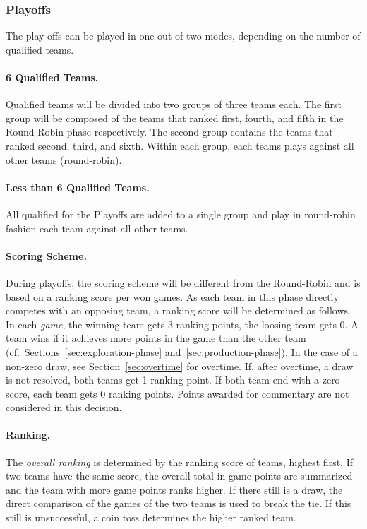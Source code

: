 \documentclass[12pt,twoside]{article}
\newcommand{\refsec}[1]{Section~\ref{#1}}
\begin{document}
\subsubsection{Playoffs}
The play-offs can be played in one out of two modes, depending on the number of
qualified teams.

\paragraph{6 Qualified Teams.~}
Qualified teams will be divided into two groups of three teams each. The first
group will be composed of the teams that ranked first, fourth, and fifth in the
Round-Robin phase respectively. The second group contains the teams that ranked
second, third, and sixth. Within each group, each teams plays against all other
teams (round-robin).

\paragraph{Less than 6 Qualified Teams.~}
All qualified for the Playoffs are added to a single group and play in
round-robin fashion each team against all other teams.

\paragraph{Scoring Scheme.~}
During playoffs, the scoring scheme will be different from the Round-Robin and
is based on a ranking score per won games. As each team in this phase directly
competes with an opposing team, a ranking score will be determined as
follows. In each \emph{game}, the winning team gets 3 ranking points, the
loosing team gets 0. A team wins if it achieves more points in the game than the
other team (cf.~Sections~\ref{sec:exploration-phase}
and~\ref{sec:production-phase}).  In the case of a non-zero draw, see
\refsec{sec:overtime} for overtime.  If, after overtime, a draw is not resolved,
both teams get 1 ranking point. If both team end with a zero score, each team
gets 0 ranking points. Points awarded for commentary are not considered in this
decision.

\paragraph{Ranking.~}
The \emph{overall ranking} is determined by the ranking score of teams, highest
first. If two teams have the same score, the overall total in-game points are
summarized and the team with more game points ranks higher. If there still is a
draw, the direct comparison of the games of the two teams is used to break the
tie. If this still is unsuccessful, a coin toss determines the higher ranked
team.
\end{document}
